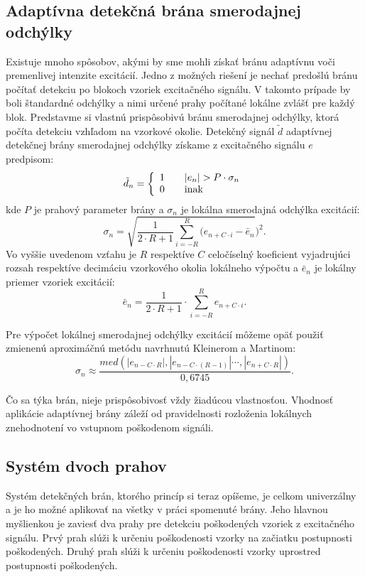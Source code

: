 \subsection{Adaptívna detekčná brána smerodajnej odchýlky}
Existuje mnoho spôsobov, akými by sme mohli získať bránu adaptívnu voči premenlivej intenzite excitácií. Jedno z možných riešení je nechať predošlú bránu počítať detekciu po blokoch vzoriek excitačného signálu. V takomto prípade by boli štandardné odchýlky a nimi určené prahy počítané lokálne zvlášť pre každý blok. Predstavme si vlastnú prispôsobivú bránu smerodajnej odchýlky, ktorá počíta detekciu vzhľadom na vzorkové okolie. Detekčný signál $\tilde{d}$ adaptívnej detekčnej brány smerodajnej odchýlky získame z excitačného signálu $e$ predpisom:
$$\tilde{d}_n = \left\{\begin{array}{l l}
	1 & \quad |e_n|> P \cdot \sigma_n\\
	0 & \quad \text{inak}\\
\end{array} \right.$$
kde $P$ je prahový parameter brány a $\sigma_n$ je lokálna smerodajná odchýlka excitácií:
$$\sigma_n=\sqrt{\frac{1}{2 \cdot R+1}\sum_{i=-R}^{R}(e_{n+C \cdot i} - \bar{e}_n})^2.$$
Vo vyššie uvedenom vzťahu je $R$ respektíve $C$ celočíselný koeficient vyjadrujúci rozsah respektíve decimáciu vzorkového okolia lokálneho výpočtu a $\bar{e}_n$ je lokálny priemer vzoriek excitácií:
$$\bar{e}_n=\frac{1}{2 \cdot R+1} \cdot \sum_{i=-R}^{R}e_{n+C \cdot i}.$$

Pre výpočet lokálnej smerodajnej odchýlky excitácií môžeme opäť použiť zmienenú aproximáčnú metódu navrhnutú Kleinerom a Martinom:
$$\sigma_n \approx \frac{med(|e_{n-C \cdot R}|, |e_{n-C \cdot (R-1)}|\cdots, |e_{n+C \cdot R}|)}{0,6745}.$$ 

Čo sa týka brán, nieje prispôsobivosť vždy žiadúcou vlastnosťou. Vhodnosť aplikácie adaptívnej brány záleží od pravidelnosti rozloženia lokálnych znehodnotení vo vstupnom poškodenom signáli.


\subsection{Systém dvoch prahov}
Systém detekčných brán, ktorého princíp si teraz opíšeme, je celkom univerzálny a je ho možné aplikovať na všetky v práci spomenuté brány. Jeho hlavnou myšlienkou je zaviesť dva prahy pre detekciu poškodených vzoriek z excitačného signálu. Prvý prah slúži k určeniu poškodenosti vzorky na začiatku postupnosti poškodených. Druhý prah slúži k určeniu poškodenosti vzorky uprostred postupnosti poškodených. 

